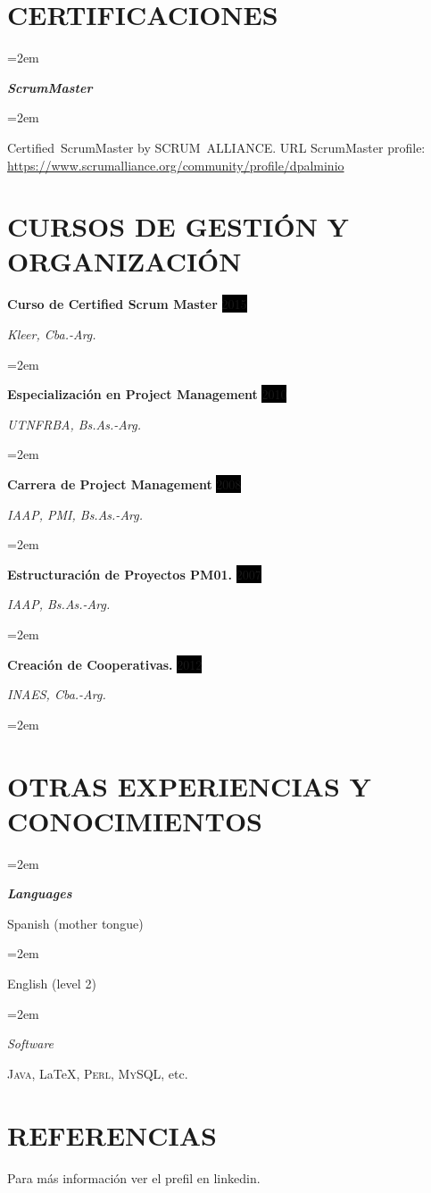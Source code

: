 \documentclass[paper=a4,fontsize=11pt]{scrartcl} %
\newlength{\spacebox}
\newcommand{\sepspace}{\vspace*{1em}}		%
\newcommand{\NewPart}[1]{\section*{\uppercase{#1}}}
\newcommand{\PersonalEntry}[2]{
		\noindent\hangindent=2em\hangafter=0 %
		\parbox{\spacebox}{        %
		\textit{#1}}		       %
		\hspace{1.5em} #2 \par}    %
\newcommand{\CertificatesEntry}[2]{      %
		\noindent\hangindent=2em\hangafter=0 %
		\parbox{\spacebox}{        %
		\textit{#1}}			   %
		\hspace{1.5em} #2 \par}    %
\newcommand{\SkillsEntry}[2]{      %
		\noindent\hangindent=2em\hangafter=0 %
		\parbox{\spacebox}{        %
		\textit{#1}}			   %
		\hspace{1.5em} #2 \par}    %
\newcommand{\EducationEntry}[4]{
		\noindent \textbf{#1} \hfill      %
		\colorbox{Black}{%
			\parbox{6em}{%
			\hfill\color{White}#2}} \par  %
		\noindent \textit{#3} \par        %
		\noindent\hangindent=2em\hangafter=0 \small #4 %
		\normalsize \par}
\newcommand{\CoursesEntry}[4]{				  %
		\noindent \textbf{#1} \hfill      %
		\colorbox{Black}{\color{White}#2} \par  %
		\noindent \textit{#3} \par              %
		\noindent\hangindent=2em\hangafter=0 \small #4 %
		\normalsize \par}
\begin{document}
\sepspace

\NewPart{Certificaciones}{}

\CertificatesEntry{\large{\textbf{ScrumMaster}}}{}
\CertificatesEntry{}{
Certified ScrumMaster by SCRUM ALLIANCE.\newline
URL ScrumMaster profile: \url{https://www.scrumalliance.org/community/profile/dpalminio}
}
\sepspace

\NewPart{Cursos de Gestión y Organización}{}

\CoursesEntry{Curso de Certified Scrum Master}{2015}{Kleer, Cba.-Arg.}{}
\CoursesEntry{Especialización en Project Management}{2010}{UTNFRBA, Bs.As.-Arg.}{}
\CoursesEntry{Carrera de Project Management}{2008}{IAAP, PMI, Bs.As.-Arg.}{}
\CoursesEntry{Estructuración de Proyectos PM01.}{2007}{IAAP, Bs.As.-Arg.}{}
\CoursesEntry{Creación de Cooperativas.}{2012}{INAES, Cba.-Arg.}{}

\sepspace

\NewPart{Otras Experiencias y Conocimientos}{}

\sepspace

\SkillsEntry{\textbf{Languages}}{Spanish (mother tongue)}
\SkillsEntry{}{English (level 2)}

\sepspace

\SkillsEntry{Software}{
\textsc{Java}, \LaTeX, \textsc{Perl}, \textsc{MySQL}, etc.
}


\NewPart{Referencias}{}
Para más información ver el prefil en linkedin.

\sepspace
\end{document}
